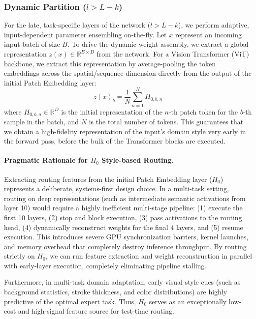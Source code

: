 \subsubsection{Dynamic Partition ($l > L-k$)}
For the late, task-specific layers of the network ($l > L-k$), we perform adaptive, input-dependent parameter ensembling on-the-fly. Let $x$ represent an incoming input batch of size $B$. To drive the dynamic weight assembly, we extract a global representation $z(x) \in \mathbb{R}^{B \times D}$ from the network. For a Vision Transformer (ViT) backbone, we extract this representation by average-pooling the token embeddings across the spatial/sequence dimension directly from the output of the initial Patch Embedding layer:
\begin{equation}
    z(x)_b = \frac{1}{N} \sum_{n=1}^N H_{0, b, n}
\end{equation}
where $H_{0, b, n} \in \mathbb{R}^D$ is the initial representation of the $n$-th patch token for the $b$-th sample in the batch, and $N$ is the total number of tokens. This guarantees that we obtain a high-fidelity representation of the input's domain style very early in the forward pass, before the bulk of the Transformer blocks are executed.

\paragraph{Pragmatic Rationale for $H_0$ Style-based Routing.}
Extracting routing features from the initial Patch Embedding layer ($H_0$) represents a deliberate, systems-first design choice. In a multi-task setting, routing on deep representations (such as intermediate semantic activations from layer 10) would require a highly inefficient multi-stage pipeline: (1) execute the first 10 layers, (2) stop and block execution, (3) pass activations to the routing head, (4) dynamically reconstruct weights for the final 4 layers, and (5) resume execution. This introduces severe GPU synchronization barriers, kernel launches, and memory overhead that completely destroy inference throughput. By routing strictly on $H_0$, we can run feature extraction and weight reconstruction in parallel with early-layer execution, completely eliminating pipeline stalling. 

Furthermore, in multi-task domain adaptation, early visual style cues (such as background statistics, stroke thickness, and color distributions) are highly predictive of the optimal expert task. Thus, $H_0$ serves as an exceptionally low-cost and high-signal feature source for test-time routing.


